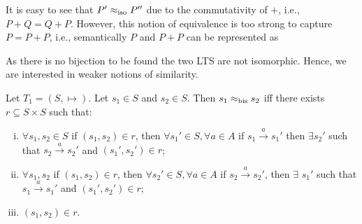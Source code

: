 \begin{example}
    It is easy to see that  $P' \approx_{\mathrm{iso}} P''$ due to the commutativity of $+$, i.e., $P+Q=Q+P$. 
    However, this notion of equivalence is too strong to capture $P=P+P$, i.e., semantically $P$ and $P+P$ can be represented  as
    
    \begin{center}
 \end{center}
 As there is no bijection to be found the two LTS are not isomorphic. Hence, we are interested in weaker notions of similarity. 
\end{example}


\begin{definition}[Bisimilarity]
    Let $T_1 = (S,\mapsto)$. Let $s_1 \in S$ and $s_2 \in S$. Then $s_1 \approx_{\mathrm{bis}} s_2$ iff there exists $r \subseteq S \times S$ such that:
    \begin{enumerate}[(i),noitemsep]
        \item $ \forall s_1,s_2\in S$ if  $(s_1,s_2) \in r$, then $\forall s_1' \in S, \forall a\in A$ if $s_1 \xrightarrow{a} s_1'$ then $\exists s_2'$ such that $s_2 \xrightarrow{a} s_2'$ and $(s_1',s_2') \in r$;
        \item $\forall s_1,s_2$ if $(s_1,s_2) \in r$, then $\forall s_2'\in S, \forall a \in A$ if $s_2 \xrightarrow{a} s_2'$, then $\exists$ $s_1'$ such that $s_1 \xrightarrow{a} s_1'$ and $(s_1',s_2') \in r$; 
        \item $(s_1,s_2) \in r$.
    \end{enumerate}
\end{definition}

